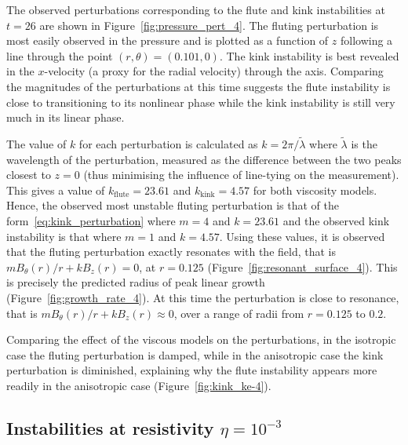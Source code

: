 \documentclass[fleqn,usenatbib]{mnras}
\newcommand{\rev}[1]{{\color{red} {#1}}}
\begin{document}
The observed perturbations corresponding to the flute and kink instabilities at
$t=26$ are shown in Figure~\ref{fig:pressure_pert_4}. The fluting perturbation
is most easily observed in the pressure and is plotted as a function of $z$
following a line through the point $(r, \theta) = (0.101, 0)$. The kink
instability is best revealed in the $x$-velocity (a proxy for the radial
velocity) through the axis. Comparing the magnitudes of the perturbations at
this time suggests the flute instability is close to transitioning to its
nonlinear phase while the kink instability is still very much in its linear
phase.

The value of $k$ for each perturbation is calculated as $k
= 2\pi/\tilde{\lambda}$ where $\tilde{\lambda}$ is the wavelength of the
perturbation, measured as the difference between the two peaks closest to $z=0$
(thus minimising the influence of line-tying on the measurement). This gives
a value of $k_{\text{flute}}=23.61$ and $k_{\text{kink}}=4.57$ for both
viscosity models. Hence, the observed most unstable fluting perturbation is
that of the form~\eqref{eq:kink_perturbation} where $m=4$ and $k=23.61$ and the
observed kink instability is that where $m=1$ and $k=4.57$. Using these values,
it is observed that the fluting perturbation exactly resonates with the field,
that is $m B_{\theta}(r)/r + kB_z(r) = 0$, at $r=0.125$
(Figure~\ref{fig:resonant_surface_4}). This is precisely the predicted radius
of peak linear growth (Figure~\ref{fig:growth_rate_4}). At this time the
perturbation is close to resonance, that is $m B_{\theta}(r)/r + kB_z(r)
\approx 0$, over a range of radii from $r=0.125$ to $0.2$.

Comparing the effect of the viscous models on the perturbations, \rev{in the
isotropic case the fluting perturbation is damped}, while in the anisotropic
case the kink perturbation is diminished, explaining why the flute instability
appears more readily in the anisotropic case (Figure~\ref{fig:kink_ke-4}).

\subsection{Instabilities at resistivity $\eta=10^{-3}$}
\end{document}
